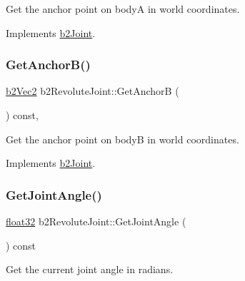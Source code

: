 Get the anchor point on bodyA in world coordinates. 



Implements \mbox{\hyperlink{classb2_joint_abe46ca3aad5db73909a9b5a7b2117447}{b2\+Joint}}.

\mbox{\label{classb2_revolute_joint_aa30a5d414b2ff699cc17567ff6e53e6b}} 
\subsubsection{\texorpdfstring{GetAnchorB()}{GetAnchorB()}}
{\footnotesize\ttfamily \mbox{\hyperlink{structb2_vec2}{b2\+Vec2}} b2\+Revolute\+Joint\+::\+Get\+AnchorB (\begin{DoxyParamCaption}{ }\end{DoxyParamCaption}) const\hspace{0.3cm}{\ttfamily [override]}, {\ttfamily [virtual]}}



Get the anchor point on bodyB in world coordinates. 



Implements \mbox{\hyperlink{classb2_joint_a88e947c65d4ea26fe539f02a8cb7f7a9}{b2\+Joint}}.

\mbox{\label{classb2_revolute_joint_a2a83b2276c71bf287771004838f2b507}} 
\subsubsection{\texorpdfstring{GetJointAngle()}{GetJointAngle()}}
{\footnotesize\ttfamily \mbox{\hyperlink{b2_settings_8h_aacdc525d6f7bddb3ae95d5c311bd06a1}{float32}} b2\+Revolute\+Joint\+::\+Get\+Joint\+Angle (\begin{DoxyParamCaption}{ }\end{DoxyParamCaption}) const}



Get the current joint angle in radians. 

\mbox{\label{classb2_revolute_joint_a631b7bd2c72b61f03b6efc605308092f}} 
